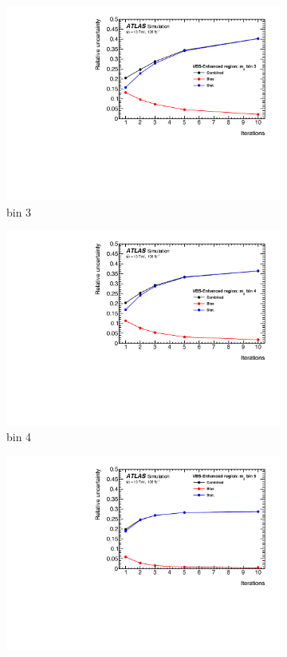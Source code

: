 \begin{figure}[htb]
\begin{subfigure}{.48\textwidth}
        \includegraphics[width=.9\linewidth]{figures/Analysis/Unfolding/unfoldingbias/unfolding_bias_stat_unc_mjj_VBSEnh_bin3.pdf}
        \caption{ bin 3 }
    \end{subfigure}
    \begin{subfigure}{.48\textwidth}
        \centering
        \includegraphics[width=.9\linewidth]{figures/Analysis/Unfolding/unfoldingbias/unfolding_bias_stat_unc_mjj_VBSEnh_bin4.pdf}
        \caption{bin 4 }
    \end{subfigure}
    \begin{subfigure}{.48\textwidth}
        \centering
        \includegraphics[width=.9\linewidth]{figures/Analysis/Unfolding/unfoldingbias/unfolding_bias_stat_unc_mjj_VBSEnh_bin5.pdf}

\end{subfigure}
\end{figure}
